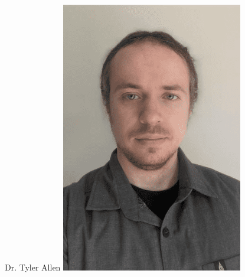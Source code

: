 \documentclass[aspectratio=169]{beamer}
\begin{document}
\begin{frame}
\begin{columns}
    Dr. Tyler Allen
    \includegraphics[width=.9\linewidth]{pics/Allen.png}
    

\end{columns}
\end{frame}
\end{document}

